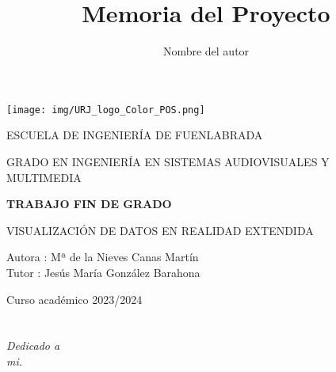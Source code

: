 \documentclass[a4paper, 12pt]{book}
\title{Memoria del Proyecto}
\author{Nombre del autor}
\begin{document}
\renewcommand{\refname}{Bibliografía}  %
\renewcommand{\appendixname}{Apéndice}



\begin{titlepage}
\begin{center}
\texttt{[image: img/URJ\_logo\_Color\_POS.png]}

\vspace{1.75cm}

\LARGE
ESCUELA DE INGENIERÍA DE FUENLABRADA
\vspace{1cm}

\LARGE
GRADO EN INGENIERÍA EN SISTEMAS AUDIOVISUALES Y MULTIMEDIA

\vspace{1cm}
\LARGE
\textbf{TRABAJO FIN DE GRADO}

\vspace{2cm}

\Large
VISUALIZACIÓN DE DATOS EN REALIDAD EXTENDIDA

\vspace{2cm}

\large
Autora : Mª de la Nieves Canas Martín \\
Tutor : Jesús María González Barahona\\

\vspace{1cm}

\large
Curso académico 2023/2024

\end{center}
\end{titlepage}

\newpage
\mbox{}
\thispagestyle{empty} %



\clearpage
{}
\chapter*{}
\begin{flushright}
\textit{Dedicado a \\
mi.}
\end{flushright}

\end{document}
